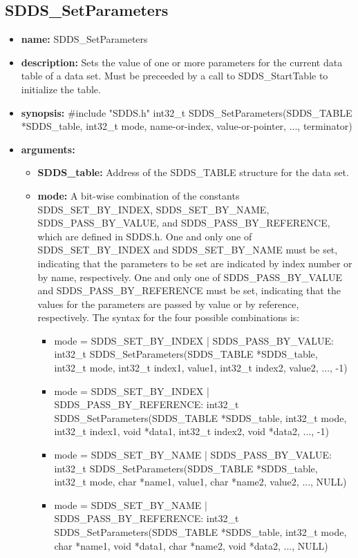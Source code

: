 \documentclass[11pt]{article}
\begin{document}
\subsection{SDDS\_SetParameters}
\label{SDDS_SetParameters}

\begin{itemize}
\item {\bf name:}\newline
SDDS\_SetParameters
\item {\bf description:}\newline
Sets the value of one or more parameters for the current data table of a data set. Must be preceeded by a call to SDDS\_StartTable to initialize the table.
\item {\bf synopsis:} \#include "SDDS.h"\newline
int32\_t SDDS\_SetParameters(SDDS\_TABLE *SDDS\_table, int32\_t mode,  name-or-index,  value-or-pointer, ...,  terminator)
\item {\bf arguments:}
\begin{itemize}
\item {\bf SDDS\_table:} Address of the SDDS\_TABLE structure for the data set.
\item {\bf mode:} A bit-wise combination of the constants SDDS\_SET\_BY\_INDEX, SDDS\_SET\_BY\_NAME, SDDS\_PASS\_BY\_VALUE, and SDDS\_PASS\_BY\_REFERENCE, which are defined in  SDDS.h. One and only one of SDDS\_SET\_BY\_INDEX and SDDS\_SET\_BY\_NAME must be set, indicating that the parameters to be set are indicated by index number or by name, respectively. One and only one of SDDS\_PASS\_BY\_VALUE and SDDS\_PASS\_BY\_REFERENCE must be set, indicating that the values for the parameters are passed by value or by reference, respectively. The syntax for the four possible combinations is:
\begin{itemize}
\item mode = SDDS\_SET\_BY\_INDEX | SDDS\_PASS\_BY\_VALUE: int32\_t SDDS\_SetParameters(SDDS\_TABLE *SDDS\_table, int32\_t mode, int32\_t index1,  value1, int32\_t index2,  value2, ..., -1)
\item mode = SDDS\_SET\_BY\_INDEX | SDDS\_PASS\_BY\_REFERENCE: int32\_t SDDS\_SetParameters(SDDS\_TABLE *SDDS\_table, int32\_t mode, int32\_t index1, void *data1, int32\_t index2, void *data2, ..., -1)
\item mode = SDDS\_SET\_BY\_NAME | SDDS\_PASS\_BY\_VALUE: int32\_t SDDS\_SetParameters(SDDS\_TABLE *SDDS\_table, int32\_t mode, char *name1,  value1, char *name2,  value2, ..., NULL)
\item mode = SDDS\_SET\_BY\_NAME | SDDS\_PASS\_BY\_REFERENCE: int32\_t SDDS\_SetParameters(SDDS\_TABLE *SDDS\_table, int32\_t mode, char *name1, void *data1, char *name2, void *data2, ..., NULL)  

\end{itemize}
\end{itemize}
\end{itemize}
\end{document}
